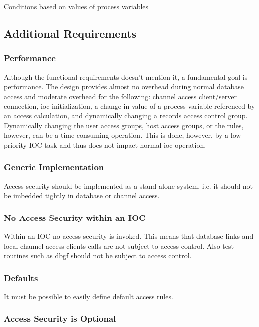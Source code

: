 Conditions based on values of process variables

\subsection{Additional Requirements}

\subsubsection{Performance}

Although the functional requirements doesn't mention it, a fundamental goal is performance. The design provides almost 
no overhead during normal database access and moderate overhead for the following: channel access client/server 
connection, ioc initialization, a change in value of a process variable referenced by an access calculation, and dynamically 
changing a records access control group. Dynamically changing the user access groups, host access groups, or the rules, 
however, can be a time consuming operation. This is done, however, by a low priority IOC task and thus does not impact 
normal ioc operation. 

\subsubsection{Generic Implementation}

Access security should be implemented as a stand alone system, i.e. it should not be imbedded tightly in database or 
channel access.

\subsubsection{No Access Security within an IOC}

Within an IOC no access security is invoked. This means that database links and local channel access clients calls are not 
subject to access control. Also test routines such as dbgf should not be subject to access control.

\subsubsection{Defaults}

It must be possible to easily define default access rules.

\subsubsection{Access Security is Optional}

